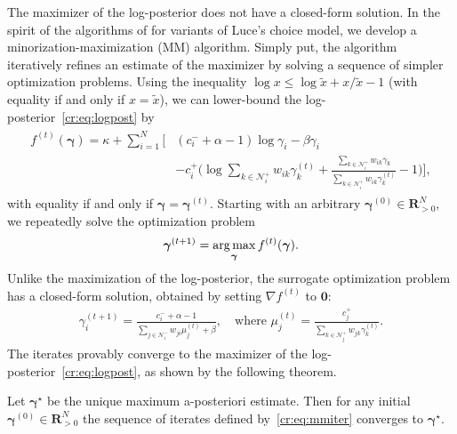 The maximizer of the log-posterior does not have a closed-form solution.
In the spirit of the algorithms of \citet{hunter2004mm} for variants of Luce's choice model, we develop a minorization-maximization (MM) algorithm.
Simply put, the algorithm iteratively refines an estimate of the maximizer by solving a sequence of simpler optimization problems.
Using the inequality $\log x \le \log \tilde{x} + x/\tilde{x} - 1$ (with equality if and only if $x = \tilde{x}$), we can lower-bound the log-posterior~\eqref{cr:eq:logpost} by
\begin{align}
\label{cr:eq:minorizing}
\begin{aligned}
f^{(t)}(\bm{\gamma}) = \kappa + \sum_{i = 1}^N \bigg[
    & (c^-_i + \alpha - 1) \log \gamma_i - \beta \gamma_i \\
    &- c^+_i \bigg( \log\!\sum_{k \in \mathcal{N}^+_i}\!w_{ik} \gamma^{(t)}_k
                   +\frac{\sum_{k \in \mathcal{N}^+_i}\!w_{ik} \gamma_k}{\sum_{k \in \mathcal{N}^+_i}\!w_{ik} \gamma^{(t)}_k} -1 \bigg) \bigg],
\end{aligned}
\end{align}
with equality if and only if $\bm{\gamma} = \bm{\gamma}^{(t)}$.
Starting with an arbitrary $\bm{\gamma}^{(0)} \in \mathbf{R}^N_{>0}$, we repeatedly solve the optimization problem
\begin{align*}
\bm{\gamma}^{(t+1)} = \operatorname*{arg\,max}_{\bm{\gamma}} f^{(t)}(\bm{\gamma}).
\end{align*}
Unlike the maximization of the log-posterior, the surrogate optimization problem has a closed-form solution, obtained by setting $\nabla f^{(t)}$ to $\bm{0}$:
\begin{align}
\label{cr:eq:mmiter}
\gamma_i^{(t + 1)} = \frac{c^-_i + \alpha - 1}{\sum_{j \in \mathcal{N}^-_i} w_{ji} \mu_j^{(t)} + \beta},
    \quad \text{where }
    \mu_j^{(t)} = \frac{c^+_j}{\sum_{k \in \mathcal{N}^+_j} w_{jk} \gamma_k^{(t)}}.
\end{align}
The iterates provably converge to the maximizer of the log-posterior~\eqref{cr:eq:logpost}, as shown by the following theorem.

\begin{theorem}
\label{cr:thm:mmconv}
Let $\bm{\gamma}^\star$ be the unique maximum a-posteriori estimate.
Then for any initial $\bm{\gamma}^{(0)} \in \mathbf{R}^N_{> 0}$ the sequence of iterates defined by~\eqref{cr:eq:mmiter} converges to $\bm{\gamma}^\star$.
\end{theorem}

